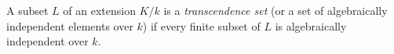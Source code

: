 A subset $L$ of an extension $K/k$ is a \textit{transcendence set} (or a set of algebraically independent elements over $k$) if every finite subset of $L$ is algebraically independent over $k$.

